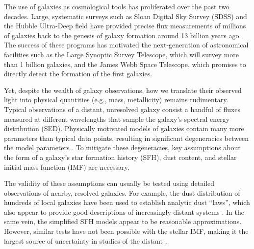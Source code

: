\documentclass[11pt,preprint]{aastex}
\begin{document}
The use of galaxies as cosmological tools has proliferated over the past two decades.  Large, systematic surveys such as Sloan Digital Sky Survey (SDSS) and the Hubble Ultra-Deep field have provided precise flux measurements of millions of galaxies back to the genesis of galaxy formation around 13 billion years ago.  The success of these programs has motivated the next-generation of astronomical facilities such as the Large Synoptic Survey Telescope, which will survey more than 1 billion galaxies, and the James Webb Space Telescope, which promises to directly detect the formation of the first galaxies.

Yet, despite the wealth of galaxy observations, how we translate their observed light into physical quantities (e.g., mass, metallicity) remains rudimentary.  Typical observations of a distant, unresolved galaxy consist a handful of fluxes measured at different wavelengths that sample the galaxy's spectral energy distribution (SED).  Physically motivated models of galaxies contain many more parameters than typical data points, resulting in significant degeneracies between the model parameters \citep[e.g.,][]{conroy2013}. To mitigate these degeneracies, key assumptions about the form of a galaxy's star formation history (SFH), dust content, and stellar initial mass function (IMF) are necessary.  

The validity of these assumptions can usually be tested using detailed observations of nearby, resolved galaxies.  For example, the dust distribution of hundreds of local galaxies have been used to establish analytic dust ``laws'', which also appear to provide good descriptions of increasingly distant systems \citep[e.g.,][]{calzetti2000}.  In the same vein, the simplified SFH models appear to be reasonable approximations.  However, similar tests have not been possible with the stellar IMF, making it the largest source of uncertainty in studies of the distant \citep[e.g.,][]{cool2008, conroy2013}.
\end{document}

